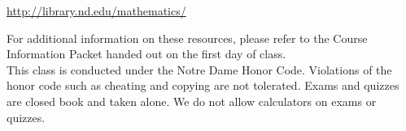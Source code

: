 \documentclass{article}[12pt]
\begin{document}
 \centerline{\url{http://library.nd.edu/mathematics/}}
\noindent For additional information on these resources, please refer to the Course Information Packet handed out on the first day of class. \\

  This class is conducted under the Notre Dame Honor Code. Violations of the honor code such as cheating and copying are not tolerated. Exams and quizzes are closed book and taken alone. We do not allow calculators on exams or quizzes. 
\end{document}
